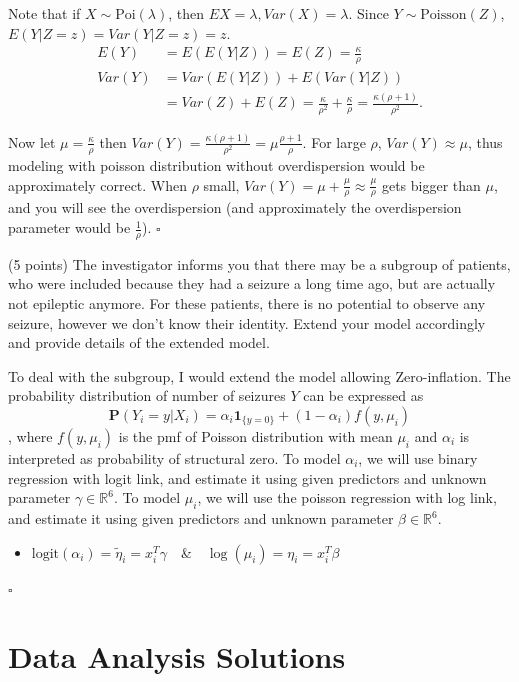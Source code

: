 \documentclass[11pt]{article}
\newcommand{\0}{{\mathbf{0}}}
\newcommand{\1}{{\mathbf{1}}}
\newcommand{\pr}[1]{\noindent{\bf #1.}}
\newcommand{\so}{\noindent{\textsc{Solution.\;\;}}}
\newcommand{\ed}{\hfill$\square$}
\begin{document}
\so

Note that if $X\sim \text{Poi}(\lambda)$, then $EX = \lambda, Var(X) = \lambda$. Since $Y\sim \text{Poisson}(Z)$, $E(Y|Z=z) = Var(Y|Z=z) = z$.
\begin{align*}
E(Y) &= E(E(Y|Z)) = E(Z) = \frac{\kappa}{\rho}\\
Var(Y) &= Var(E(Y|Z)) + E(Var(Y|Z))\\
	& = Var(Z) + E(Z) = \frac{\kappa}{\rho^2} + \frac{\kappa}{\rho} = \frac{\kappa(\rho+1)}{\rho^2}.
\end{align*}

Now let $\mu = \frac{\kappa}{\rho}$ then $Var(Y) = \frac{\kappa(\rho+1)}{\rho^2} = \mu \frac{\rho+1}{\rho}$. For large $\rho$, $Var(Y) \approx \mu$, thus modeling with poisson distribution without overdispersion would be approximately correct. When $\rho$ small, $Var(Y) = \mu +\frac{\mu}{\rho} \approx \frac{\mu}{\rho}$ gets bigger than $\mu$, and you will see the overdispersion (and approximately the overdispersion parameter would be $\frac{1}{\rho}$).
\ed

\pr{9} (5 points) The investigator informs you that there may be a subgroup of patients, who were included because they had a seizure a long time ago, but are actually not epileptic anymore. For these patients, there is no potential to observe any seizure, however we don’t know their identity. Extend your model accordingly and provide details of the extended model.

\so

To deal with the subgroup, I would extend the model allowing Zero-inflation. 
The probability distribution of number of seizures $Y$ can be expressed as 
$$\mathbf{P}(Y_i = y | X_i) = \alpha_i \mathbf{1}_{\{y = 0\}} + (1-\alpha_i) f(y,\mu_i)$$
, where $f(y,\mu_i)$ is the pmf of Poisson distribution with mean $\mu_i$ and $\alpha_i$ is interpreted as probability of structural zero.
To model $\alpha_i$, we will use binary regression with logit link, and estimate it using given predictors and unknown parameter $\gamma \in \mathbb{R}^6$. To model $\mu_i$, we will use the poisson regression with log link, and estimate it using given predictors and unknown parameter $\beta\in \mathbb{R}^6$.
\begin{itemize}
\item $\text{logit}(\alpha_i) = \tilde{\eta}_i = x_i^T\gamma$\ \ \&\ \ $\log(\mu_i) = \eta_i = x_i^T\beta$
\end{itemize}

\ed


\section{Data Analysis Solutions}
\end{document}
